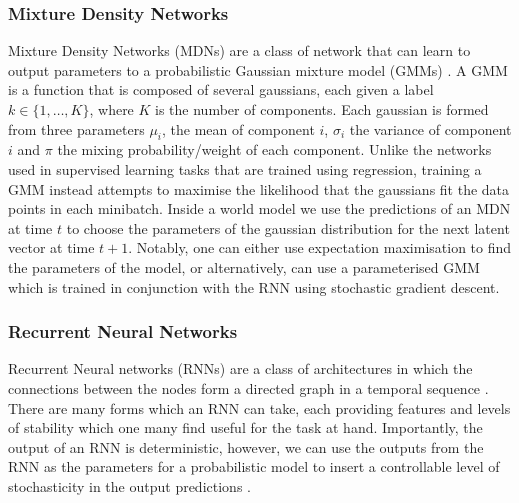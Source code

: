 \subsubsection{Mixture Density Networks}
Mixture Density Networks (MDNs) are a class of network that can learn to output parameters to a probabilistic Gaussian mixture model (GMMs) \cite{bishop1994mixture}. A GMM is a function that is composed of several gaussians, each given a label $k \in \lbrace 1, \ldots, K \rbrace$, where $K$ is the number of components. Each gaussian is formed from three parameters $\mu_i$, the mean of component $i$, $\sigma_i$ the variance of component $i$ and $\pi$ the mixing probability/weight of each component. Unlike the networks used in supervised learning tasks that are trained using regression, training a GMM instead attempts to maximise the likelihood that the gaussians fit the data points in each minibatch. Inside a world model we use the predictions of an MDN at time $t$ to choose the parameters of the gaussian distribution for the next latent vector at time $t+1$. Notably, one can either use expectation maximisation to find the parameters of the model, or alternatively, can use a parameterised GMM which is trained in conjunction with the RNN using stochastic gradient descent.


\subsubsection{Recurrent Neural Networks}
\label{sec:rlopt:subsec:rnn}

Recurrent Neural networks (RNNs) are a class of architectures in which the connections between the nodes form a directed graph in a temporal sequence \cite{650093}. There are many forms which an RNN can take, each providing features and levels of stability which one many find useful for the task at hand. Importantly, the output of an RNN is deterministic, however, we can use the outputs from the RNN as the parameters for a probabilistic model to insert a controllable level of stochasticity in the output predictions \cite{graves2014generating}.

